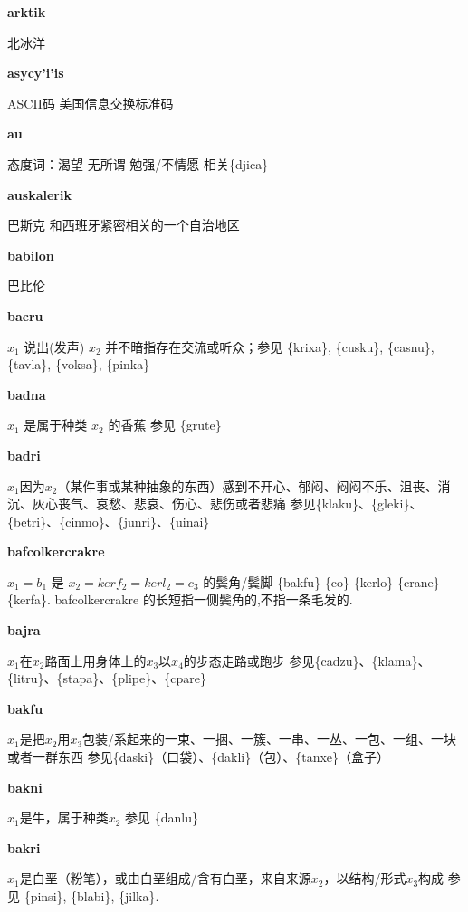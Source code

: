 \documentclass[notitlepage,twocolumn,a4paper,10pt]{book}
\begin{document}
{\sffamily\bfseries arktik} 北冰洋

{\sffamily\bfseries asycy'i'is} ASCII码 \textemdash{} 美国信息交换标准码

{\sffamily\bfseries au}\enspace {\sffamily\bfseries[UI1]}  态度词：渴望-无所谓-勉强\slash{}不情愿 \textemdash{} 相关\{djica\}

{\sffamily\bfseries auskalerik} 巴斯克 \textemdash{} 和西班牙紧密相关的一个自治地区

{\sffamily\bfseries babilon} 巴比伦

{\sffamily\bfseries bacru}\enspace {\ttfamily\bfseries[        ba'u]}  $x_1$ 说出(发声) $x_2$ \textemdash{} 并不暗指存在交流或听众；参见 \{krixa\}, \{cusku\}, \{casnu\}, \{tavla\}, \{voksa\}, \{pinka\}

{\sffamily\bfseries badna} $x_1$ 是属于种类 $x_2$ 的香蕉 \textemdash{} 参见 \{grute\}

{\sffamily\bfseries badri}\enspace {\ttfamily\bfseries[    dri]}  $x_1$因为$x_2$（某件事或某种抽象的东西）感到不开心、郁闷、闷闷不乐、沮丧、消沉、灰心丧气、哀愁、悲哀、伤心、悲伤或者悲痛 \textemdash{} 参见\{klaku\}、\{gleki\}、\{betri\}、\{cinmo\}、\{junri\}、\{uinai\}

{\sffamily\bfseries bafcolkercrakre} $x_1=b_1$ 是 $x_2=kerf_2=kerl_2=c_3$ 的鬓角\slash{}鬓脚 \textemdash{} \{bakfu\} \{co\} \{kerlo\} \{crane\} \{kerfa\}. bafcolkercrakre 的长短指一侧鬓角的,不指一条毛发的.

{\sffamily\bfseries bajra}\enspace {\ttfamily\bfseries[baj]}  $x_1$在$x_2$路面上用身体上的$x_3$以$x_4$的步态走路或跑步 \textemdash{} 参见\{cadzu\}、\{klama\}、\{litru\}、\{stapa\}、\{plipe\}、\{cpare\}

{\sffamily\bfseries bakfu}\enspace {\ttfamily\bfseries[baf]}  $x_1$是把$x_2$用$x_3$包装\slash{}系起来的一束、一捆、一簇、一串、一丛、一包、一组、一块或者一群东西 \textemdash{} 参见\{daski\}（口袋）、\{dakli\}（包）、\{tanxe\}（盒子）

{\sffamily\bfseries bakni}\enspace {\ttfamily\bfseries[bak]}  $x_1$是牛，属于种类$x_2$ \textemdash{} 参见 \{danlu\}

{\sffamily\bfseries bakri} $x_1$是白垩（粉笔），或由白垩组成\slash{}含有白垩，来自来源$x_2$，以结构\slash{}形式$x_3$构成 \textemdash{} 参见 \{pinsi\}, \{blabi\}, \{jilka\}.
\end{document}
